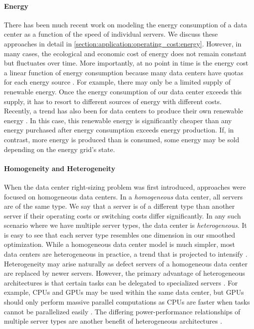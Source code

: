 \paragraph{Energy} There has been much recent work on modeling the energy consumption of a data center as a function of the speed of individual servers. We discuss these approaches in detail in \autoref{section:application:operating_cost:energy}. However, in many cases, the ecological and economic cost of energy does not remain constant but fluctuates over time. More importantly, at no point in time is the energy cost a linear function of energy consumption because many data centers have quotas for each energy source \cite{Miller2021}. For example, there may only be a limited supply of renewable energy. Once the energy consumption of our data center exceeds this supply, it has to resort to different sources of energy with different costs. Recently, a trend has also been for data centers to produce their own renewable energy \cite{Lin2012}. In this case, this renewable energy is significantly cheaper than any energy purchased after energy consumption exceeds energy production. If, in contrast, more energy is produced than is consumed, some energy may be sold depending on the energy grid's state.

\paragraph{Homogeneity and Heterogeneity} When the data center right-sizing problem was first introduced, approaches were focused on homogeneous data centers. In a \emph{homogeneous} data center, all servers are of the same type. We say that a server is of a different type than another server if their operating costs or switching costs differ significantly. In any such scenario where we have multiple server types, the data center is \emph{heterogeneous}. It is easy to see that each server type resembles one dimension in our smoothed optimization. While a homogeneous data center model is much simpler, most data centers are heterogeneous in practice, a trend that is projected to intensify \cite{Jin2016}. Heterogeneity may arise naturally as defect servers of a homogeneous data center are replaced by newer servers. However, the primary advantage of heterogeneous architectures is that certain tasks can be delegated to specialized servers \cite{Jin2016}. For example, CPUs and GPUs may be used within the same data center, but GPUs should only perform massive parallel computations as CPUs are faster when tasks cannot be parallelized easily \cite{Shan2006}. The differing power-performance relationships of multiple server types are another benefit of heterogeneous architectures \cite{Jin2016}.

